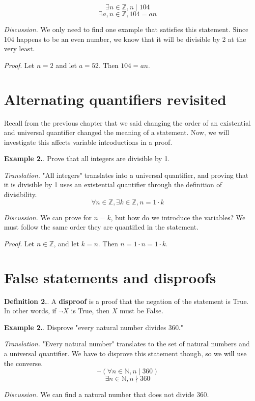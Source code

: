 \documentclass{article}
\newcounter{defcount}
\newcounter{excount}
\newcommand\df{\stepcounter{defcount} \textbf{Definition 2.\thedefcount}. }
\newcommand\ex{\stepcounter{excount} \textbf{Example 2.\theexcount}. }
\begin{document}
$$\exists n \in \mathbb{Z}, n \mid 104$$
$$\exists a, n \in \mathbb{Z}, 104 = an$$


\textit{Discussion.} We only need to find one example that satisfies this 
statement. Since 104 happens to be an even number, we know that it will be 
divisible by 2 at the very least.

\textit{Proof.} Let $n = 2$ and let $a = 52$. Then $104 = an$.

\section{Alternating quantifiers revisited}
Recall from the previous chapter that we said changing the order of 
an existential and universal quantifier changed the meaning of a statement. 
Now, we will investigate this affects variable introductions in a proof.

\newpage
\ex Prove that all integers are divisible by 1. 

\textit{Translation.} "All integers" translates into a universal quantifier, 
and proving that it is divisible by 1 uses an existential quantifier through 
the definition of divisibility. 
$$\forall n \in \mathbb{Z}, \exists k \in \mathbb{Z}, n = 1 \cdot k$$

\textit{Discussion.} We can prove for $n = k$, but how do we introduce the 
variables? We must follow the same order they are quantified in the 
statement.

\textit{Proof.} Let $n \in \mathbb{Z}$, and let $k = n$. Then $n = 1
\cdot n = 1 \cdot k$.

\section{False statements and disproofs}
\df A \textbf{disproof} is a proof that the negation of the statement is True. 
In other words, if $\neg X$ is True, then $X$ must be False.

\ex Disprove "every natural number divides 360."

\textit{Translation.} "Every natural number" translates to the set of 
natural numbers and a universal quantifier. We have to disprove this statement 
though, so we will use the converse.
$$\neg(\forall n \in \mathbb{N}, n \mid 360)$$
$$\exists n \in \mathbb{N}, n \nmid 360$$

\textit{Discussion.} We can find a natural number that does not divide 
360. 
\end{document}
